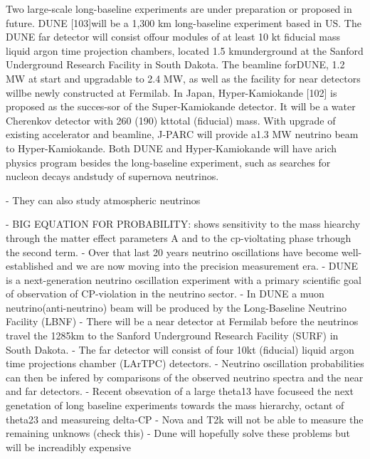 Two large-scale long-baseline experiments are under preparation or proposed in future. DUNE
    [103]will be a 1,300 km long-baseline experiment based in US. The DUNE far detector will
consist offour modules of at least 10 kt fiducial mass liquid argon time projection chambers,
located 1.5 kmunderground at the Sanford Underground Research Facility in South Dakota. The
beamline forDUNE, 1.2 MW at start and upgradable to 2.4 MW, as well as the facility for near
detectors willbe newly constructed at Fermilab. In Japan, Hyper-Kamiokande [102] is proposed
as the succes-sor of the Super-Kamiokande detector. It will be a water Cherenkov detector with
260 (190) kttotal (fiducial) mass. With upgrade of existing accelerator and beamline, J-PARC
will provide a1.3 MW neutrino beam to Hyper-Kamiokande. Both DUNE and Hyper-Kamiokande will
have arich physics program besides the long-baseline experiment, such as searches for nucleon
decays andstudy of supernova neutrinos.

- They can also study atmospheric neutrinos

- BIG EQUATION FOR PROBABILITY: shows sensitivity to the mass hiearchy through the matter effect
parameters A and to the cp-violtating phase trhough the second term.
- Over that last 20 years neutrino oscillations have become well-established and we are now moving
into the precision measurement era.
- DUNE is a next-generation neutrino oscillation experiment with a primary scientific goal of
observation of CP-violation in the neutrino sector.
- In DUNE a muon neutrino(anti-neutrino) beam will be produced by the Long-Baseline Neutrino
Facility (LBNF)
- There will be a near detector at Fermilab before the neutrinos travel the 1285km to the Sanford
Underground Research Facility (SURF) in South Dakota.
- The far detector will consist of four 10kt (fiducial) liquid argon time projections chamber
(LArTPC) detectors.
- Neutrino oscillation probabilities can then be infered by comparisons of the observed neutrino
spectra and the near and far detectors.
- Recent obsevation of a large theta13 have focuseed the next genetation of long baseline
experiments towards the mass hierarchy, octant of theta23 and measureing delta-CP
- Nova and T2k will not be able to measure the remaining unknows (check this)
- Dune will hopefully solve these problems but will be increadibly expensive

